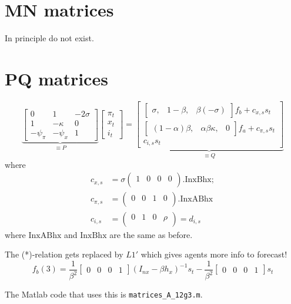 \documentclass[11pt]{article}
\renewcommand{\[}{\begin{equation}}
\renewcommand{\]}{\end{equation}}
\begin{document}
\section{MN matrices}
In principle do not exist.

\section{PQ matrices}
\begin{equation}
\underbrace{\begin{bmatrix} 0& 1&  -2\sigma \\ 1& -\kappa & 0 \\ -\psi_{\pi} & -\psi_{x} & 1 \end{bmatrix}}_{\equiv P}\begin{bmatrix} \pi_t \\ x_t \\i_t \end{bmatrix} = \underbrace{\begin{bmatrix} \begin{bmatrix}\sigma, &1-\beta, &\beta  (-\sigma )\end{bmatrix}f_b +c_{x,s} s_t \\ \begin{bmatrix}(1-\alpha ) \beta ,&\alpha  \beta  \kappa ,&0\end{bmatrix}f_a +c_{\pi,s} s_t \\ c_{i,s} s_t \end{bmatrix}}_{\equiv Q}
\end{equation}
where 
\begin{align}
c_{x,s} & = \sigma  \left(
\begin{array}{cccc}
 1 & 0 & 0 & 0\\
\end{array}
\right).\text{InxBhx};\\
c_{\pi,s} & = \left(
\begin{array}{cccc}
 0 & 0 & 1 & 0\\
\end{array}
\right).\text{InxABhx}\\
c_{i,s} & = \left(
\begin{array}{cccc}
 0 & 1 & 0 & \rho\\
\end{array}
\right) = d_{i,s}
\end{align}
where $\text{InxABhx}$ and $\text{InxBhx}$ are the same as before.

The (*)-relation gets replaced by $L1'$ which gives agents more info to forecast!
\begin{equation}
f_b(3) = \frac{1}{\beta^2}\begin{bmatrix} 0 &0 & 0 &1 \end{bmatrix}(I_{nx}-\beta h_x)^{-1} s_t - \frac{1}{\beta^2}\begin{bmatrix} 0 &0 & 0 &1  \end{bmatrix}s_t  \tag{L1'}
\end{equation}

The Matlab code that uses this is \texttt{matrices\_A\_12g3.m}.
\end{document}
